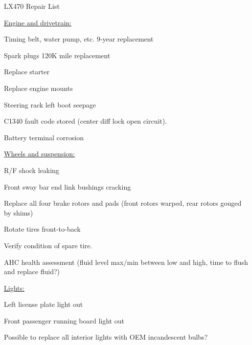 \documentclass[12pt]{article}
\begin{document}
{\large LX470 Repair List}

\vspace{0.25in}


\underline{\large Engine and drivetrain:}

\begin{todolist}
\item Timing belt, water pump, etc. 9-year replacement
\item Spark plugs 120K mile replacement
\item Replace starter
\item Replace engine mounts
\item Steering rack left boot seepage
\item C1340 fault code stored (center diff lock open circuit).
\item Battery terminal corrosion
\end{todolist}



\vspace{0.25in}

\underline{\large Wheels and suspension:}

\begin{todolist}
\item R/F shock leaking
\item Front sway bar end link bushings cracking
\item Replace all four brake rotors and pads (front rotors warped, rear rotors gouged by shims)
\item Rotate tires front-to-back
\item Verify condition of spare tire.
\item AHC health assessment (fluid level max/min between low and high, time to flush and replace fluid?)
\end{todolist}




\vspace{0.25in}

\underline{\large Lights:}

\begin{todolist}
\item Left license plate light out
\item Front passenger running board light out
\item Possible to replace all interior lights with OEM incandescent bulbs? 
\end{todolist}

\newpage
\end{document}
